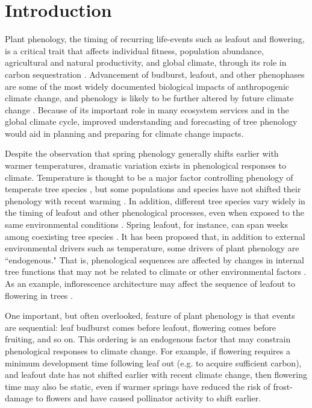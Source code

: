 \documentclass{article}
\begin{document}
\section* {Introduction}
Plant phenology, the timing of recurring life-events such as leafout and flowering, is a critical trait that affects individual fitness, population abundance, agricultural and natural productivity, and global climate, through its role in carbon sequestration \citep{chuine2001,cleland2007,willis2010,miller-rushing2010,craine2012}. Advancement of budburst, leafout, and other phenophases are some of the most widely documented biological impacts of anthropogenic climate change, and phenology is likely to be further altered by future climate change \citep{parmesan2006}. Because of its important role in many ecosystem services and in the global climate cycle, improved understanding and forecasting of tree phenology would aid in planning and preparing for climate change impacts.
\par Despite the observation that spring phenology generally shifts earlier with warmer temperatures, dramatic variation exists in phenological responses to climate. Temperature is thought to be a major factor controlling phenology of temperate tree species \citep{parmesan2006,richardson2006,morin2010,schwartz2013,clark2014b}, but some populations and species have not shifted their phenology with recent warming \citep{wolkovich2012}. In addition, different tree species vary widely in the timing of leafout and other phenological processes, even when exposed to the same environmental conditions \citep{lechowicz1984,primack2009c}. Spring leafout, for instance, can span weeks among coexisting tree species \citep{lechowicz1984}. It has been proposed that, in addition to external environmental drivers such as temperature,  some drivers of plant phenology are  ``endogenous."  That is, phenological sequences are affected by changes in internal tree functions that may not be related to climate or other environmental factors \citep{borchert1992,marco2002}. As an example, inflorescence architecture may affect the sequence of leafout to  flowering in trees \citep{marco2002}. 
\par One important, but often overlooked, feature of plant phenology is that events are sequential: leaf budburst comes before leafout, flowering comes before fruiting, and so on. This ordering is an endogenous factor that may constrain phenological responses to climate change. For example, if flowering requires a minimum development time following leaf out (e.g. to acquire sufficient carbon), and leafout date has not shifted earlier with recent climate change, then flowering time may also be static, even if warmer springs have reduced the risk of frost-damage to flowers and have caused pollinator activity to shift earlier. 
\end{document}
